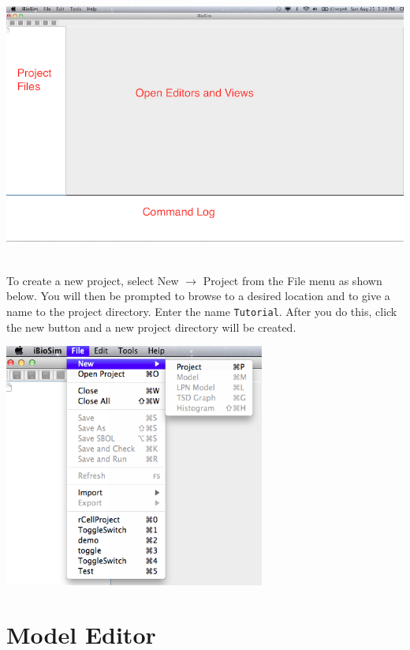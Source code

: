 \documentclass[titlepage,11pt]{article}
\begin{document}
\begin{center}
\includegraphics[height=90mm]{screenshots/iBioSim}
\end{center}

\noindent
To create a new project, select New $\rightarrow$ Project from the File menu as shown below.  You will then be prompted to browse to a desired location and to give a name to the project directory.  Enter the name {\tt Tutorial}.  After you do this, click the new button and a new project directory will be created.  

\begin{center}
\includegraphics[height=80mm]{screenshots/project}
\end{center}

\section{Model Editor}
\end{document}
